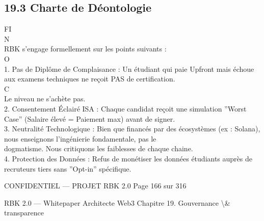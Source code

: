 \documentclass[12pt,landscape,a4paper]{article}
\newenvironment{confidential}
{\begin{tcolorbox}[
    colback=rbkred!5!white,
    colframe=rbkred!75!black,
    title=CONFIDENTIEL,
    fonttitle=\bfseries\color{white},
    coltitle=rbkred!75!black,
    breakable,
    enhanced,
    frame hidden,
    borderline west={2pt}{0pt}{rbkred!75!black}
]}
{\end{tcolorbox}}
\begin{document}
\subsection{19.3 Charte de Déontologie}
FI\\
N\\
RBK s’engage formellement sur les points suivants :\\
O\\
\vspace{0.5em}
1. Pas de Diplôme de Complaisance : Un étudiant qui paie Upfront mais échoue aux examens techniques ne reçoit PAS de certification.\\
C\\
\vspace{0.5em}
\vspace{0.5em}
Le niveau ne s’achète pas.\\
\vspace{0.5em}
2. Consentement Éclairé ISA : Chaque candidat reçoit une simulation ”Worst Case” (Salaire élevé = Paiement max) avant de signer.\\
\vspace{0.5em}
3. Neutralité Technologique : Bien que financés par des écosystèmes (ex : Solana), nous enseignons l’ingénierie fondamentale, pas le\\
dogmatisme. Nous critiquons les faiblesses de chaque chaine.\\
\vspace{0.5em}
4. Protection des Données : Refus de monétiser les données étudiants auprès de recruteurs tiers sans ”Opt-in” spécifique.\\
\vspace{0.5em}
\vspace{0.5em}
\begin{confidential}CONFIDENTIEL — PROJET RBK 2.0                              Page 166 sur 316\end{confidential}
RBK 2.0 — Whitepaper Architecte Web3                                                                              Chapitre 19. Gouvernance \textbackslash{}& transparence\\
\vspace{0.5em}
\vspace{0.5em}
\vspace{0.5em}
\end{document}
